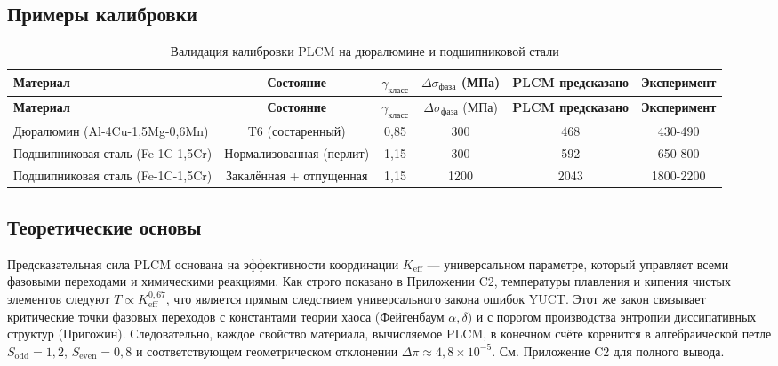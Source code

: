 \documentclass[12pt,a4paper]{article}
\begin{document}
	\subsection{Примеры калибровки}
	
	\begin{longtable}{lccccc}
		\caption{Валидация калибровки PLCM на дюралюмине и подшипниковой стали} \label{tab:calibration-validation} \\
		\toprule
		\textbf{Материал} & \textbf{Состояние} & \(\gamma_{\text{класс}}\) & \(\Delta\sigma_{\text{фаза}}\) (МПа) & \textbf{PLCM предсказано} & \textbf{Эксперимент} \\
		\midrule
		\endfirsthead
		\toprule
		\textbf{Материал} & \textbf{Состояние} & \(\gamma_{\text{класс}}\) & \(\Delta\sigma_{\text{фаза}}\) (МПа) & \textbf{PLCM предсказано} & \textbf{Эксперимент} \\
		\midrule
		\endhead
		Дюралюмин (Al-4Cu-1,5Mg-0,6Mn) & T6 (состаренный) & 0,85 & 300 & 468 & 430-490 \\
		Подшипниковая сталь (Fe-1C-1,5Cr) & Нормализованная (перлит) & 1,15 & 300 & 592 & 650-800 \\
		Подшипниковая сталь (Fe-1C-1,5Cr) & Закалённая + отпущенная & 1,15 & 1200 & 2043 & 1800-2200 \\
		\bottomrule
	\end{longtable}
	
	
	\subsection{Теоретические основы}
	
	Предсказательная сила PLCM основана на эффективности координации $K_{\mathrm{eff}}$ —
	универсальном параметре, который управляет всеми фазовыми переходами и химическими реакциями.
	Как строго показано в Приложении C2, температуры плавления и кипения чистых элементов
	следуют $T \propto K_{\mathrm{eff}}^{0,67}$, что является прямым следствием универсального
	закона ошибок YUCT. Этот же закон связывает критические точки фазовых переходов
	с константами теории хаоса (Фейгенбаум $\alpha,\delta$) и с порогом производства энтропии
	диссипативных структур (Пригожин). Следовательно, каждое свойство материала, вычисляемое
	PLCM, в конечном счёте коренится в алгебраической петле $S_{\mathrm{odd}}=1,2$,
	$S_{\mathrm{even}}=0,8$ и соответствующем геометрическом отклонении $\Delta\pi \approx 4,8\times10^{-5}$.
	См. Приложение C2 для полного вывода.
	
\end{document}

